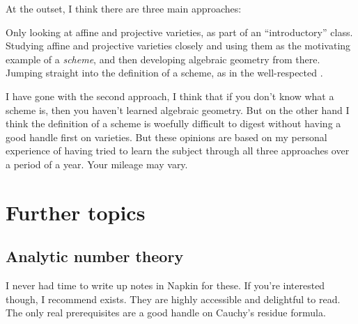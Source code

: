 At the outset, I think there are three main approaches:
\begin{itemize}
	\ii Only looking at affine and projective varieties,
	as part of an ``introductory'' class.
	\ii Studying affine and projective varieties closely
	and using them as the motivating example of a \emph{scheme},
	and then developing algebraic geometry from there.
	\ii Jumping straight into the definition of a scheme,
	as in the well-respected \cite{ref:vakil}.
\end{itemize}
I have gone with the second approach,
I think that if you don't know what a scheme is,
then you haven't learned algebraic geometry.
But on the other hand I think the definition of a scheme is woefully
difficult to digest without having a good handle first on varieties.
But these opinions are based on my personal experience of having
tried to learn the subject through all three approaches over a period of a year.
Your mileage may vary.

\section{Further topics}
\subsection{Analytic number theory}
I never had time to write up notes in Napkin for these.
If you're interested though, I recommend \cite{ref:analytic_NT} exists.
They are highly accessible and delightful to read.
The only real prerequisites are a good handle on Cauchy's residue formula.
